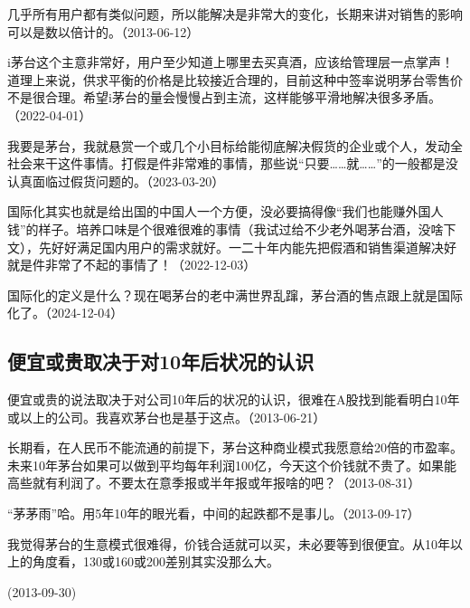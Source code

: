 
几乎所有用户都有类似问题，所以能解决是非常大的变化，长期来讲对销售的影响可以是数以倍计的。（2013-06-12）

i茅台这个主意非常好，用户至少知道上哪里去买真酒，应该给管理层一点掌声！道理上来说，供求平衡的价格是比较接近合理的，目前这种中签率说明茅台零售价不是很合理。希望i茅台的量会慢慢占到主流，这样能够平滑地解决很多矛盾。（2022-04-01）

我要是茅台，我就悬赏一个或几个小目标给能彻底解决假货的企业或个人，发动全社会来干这件事情。打假是件非常难的事情，那些说“只要……就……”的一般都是没认真面临过假货问题的。（2023-03-20）


国际化其实也就是给出国的中国人一个方便，没必要搞得像“我们也能赚外国人钱”的样子。培养口味是个很难很难的事情（我试过给不少老外喝茅台酒，没啥下文），先好好满足国内用户的需求就好。一二十年内能先把假酒和销售渠道解决好就是件非常了不起的事情了！（2022-12-03）


国际化的定义是什么？现在喝茅台的老中满世界乱蹿，茅台酒的售点跟上就是国际化了。（2024-12-04）

\subsection{便宜或贵取决于对10年后状况的认识}


便宜或贵的说法取决于对公司10年后的状况的认识，很难在A股找到能看明白10年或以上的公司。我喜欢茅台也是基于这点。（2013-06-21）

长期看，在人民币不能流通的前提下，茅台这种商业模式我愿意给20倍的市盈率。未来10年茅台如果可以做到平均每年利润100亿，今天这个价钱就不贵了。如果能高些就有利润了。不要太在意季报或半年报或年报啥的吧？（2013-08-31）


“茅茅雨”哈。用5年10年的眼光看，中间的起跌都不是事儿。（2013-09-17）

我觉得茅台的生意模式很难得，价钱合适就可以买，未必要等到很便宜。从10年以上的角度看，130或160或200差别其实没那么大。

(2013-09-30)

